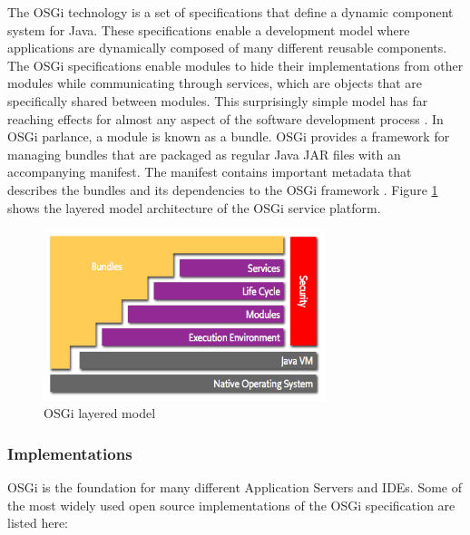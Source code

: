 The \gls{OSGi} technology is a set of specifications that define a dynamic component system for Java. These specifications enable a development model where applications are dynamically composed of many different reusable components. The \gls{OSGi} specifications enable modules to hide their implementations from other modules while communicating through services, which are objects that are specifically shared between modules. This surprisingly simple model has far reaching effects for almost any aspect of the software development process \cite{OSGi}. In \gls{OSGi} parlance, a module is known as a bundle. \gls{OSGi} provides a framework for managing bundles that are packaged as regular Java JAR files with an accompanying manifest. The manifest contains important metadata that describes the bundles and its dependencies to the \gls{OSGi} framework \cite{Knoernschild:2012}. Figure \ref{fig:layering-osgi} shows the layered model architecture of the \gls{OSGi} service platform.

\begin{figure}[H]
\centering
\includegraphics[width=0.73\textwidth]{layering-osgi.png}
\caption{\gls{OSGi} layered model \cite{OSGi}}
\label{fig:layering-osgi}
\end{figure}

\subsubsection{Implementations}
\gls{OSGi} is the foundation for many different Application Servers and IDEs. Some of the most widely used open source implementations of the \gls{OSGi} specification are listed here: 

